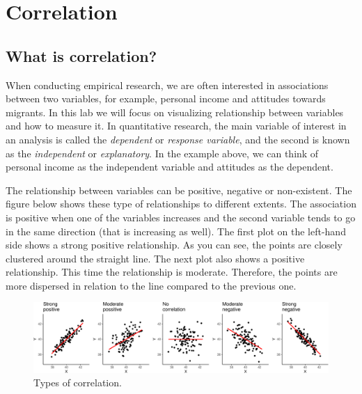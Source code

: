 \documentclass[
]{book}
\begin{document}
\hypertarget{correlation}{%
\chapter{Correlation}\label{correlation}}

\hypertarget{what-is-correlation}{%
\section{What is correlation?}\label{what-is-correlation}}

When conducting empirical research, we are often interested in associations between two variables, for example, personal income and attitudes towards migrants. In this lab we will focus on visualizing relationship between variables and how to measure it. In quantitative research, the main variable of interest in an analysis is called the \emph{dependent} or \emph{response variable}, and the second is known as the \emph{independent} or \emph{explanatory}. In the example above, we can think of personal income as the independent variable and attitudes as the dependent.

The relationship between variables can be positive, negative or non-existent. The figure below shows these type of relationships to different extents. The association is positive when one of the variables increases and the second variable tends to go in the same direction (that is increasing as well). The first plot on the left-hand side shows a strong positive relationship. As you can see, the points are closely clustered around the straight line. The next plot also shows a positive relationship. This time the relationship is moderate. Therefore, the points are more dispersed in relation to the line compared to the previous one.

\begin{figure}

\includegraphics[width=1\linewidth]{lab-workbook_files/figure-latex/unnamed-chunk-73-1} \hfill{}

\caption{\label{fig:figs} Types of correlation.}\label{fig:unnamed-chunk-73}
\end{figure}
\end{document}
